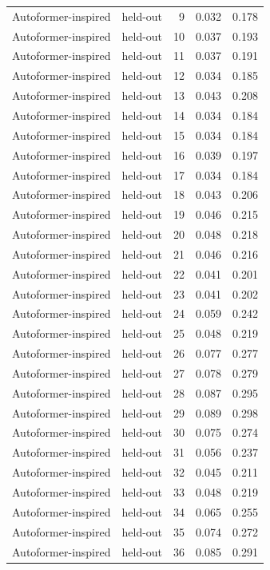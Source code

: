 \begin{tabular}{llrrr}
Autoformer-inspired & held-out & 9 & 0.032 & 0.178 \\
Autoformer-inspired & held-out & 10 & 0.037 & 0.193 \\
Autoformer-inspired & held-out & 11 & 0.037 & 0.191 \\
Autoformer-inspired & held-out & 12 & 0.034 & 0.185 \\
Autoformer-inspired & held-out & 13 & 0.043 & 0.208 \\
Autoformer-inspired & held-out & 14 & 0.034 & 0.184 \\
Autoformer-inspired & held-out & 15 & 0.034 & 0.184 \\
Autoformer-inspired & held-out & 16 & 0.039 & 0.197 \\
Autoformer-inspired & held-out & 17 & 0.034 & 0.184 \\
Autoformer-inspired & held-out & 18 & 0.043 & 0.206 \\
Autoformer-inspired & held-out & 19 & 0.046 & 0.215 \\
Autoformer-inspired & held-out & 20 & 0.048 & 0.218 \\
Autoformer-inspired & held-out & 21 & 0.046 & 0.216 \\
Autoformer-inspired & held-out & 22 & 0.041 & 0.201 \\
Autoformer-inspired & held-out & 23 & 0.041 & 0.202 \\
Autoformer-inspired & held-out & 24 & 0.059 & 0.242 \\
Autoformer-inspired & held-out & 25 & 0.048 & 0.219 \\
Autoformer-inspired & held-out & 26 & 0.077 & 0.277 \\
Autoformer-inspired & held-out & 27 & 0.078 & 0.279 \\
Autoformer-inspired & held-out & 28 & 0.087 & 0.295 \\
Autoformer-inspired & held-out & 29 & 0.089 & 0.298 \\
Autoformer-inspired & held-out & 30 & 0.075 & 0.274 \\
Autoformer-inspired & held-out & 31 & 0.056 & 0.237 \\
Autoformer-inspired & held-out & 32 & 0.045 & 0.211 \\
Autoformer-inspired & held-out & 33 & 0.048 & 0.219 \\
Autoformer-inspired & held-out & 34 & 0.065 & 0.255 \\
Autoformer-inspired & held-out & 35 & 0.074 & 0.272 \\
Autoformer-inspired & held-out & 36 & 0.085 & 0.291 \\

\end{tabular}
